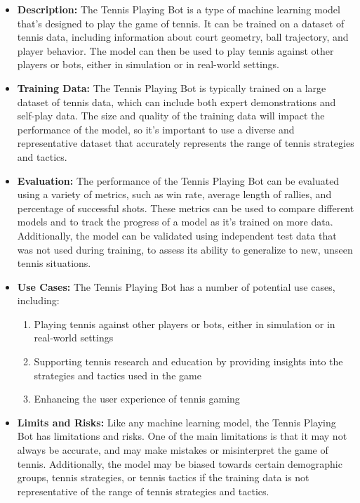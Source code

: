 \begin{itemize}
\begin{itemize}
    \item \textbf{Description:} The Tennis Playing Bot is a type of machine learning model that's designed to play the game of tennis. It can be trained on a dataset of tennis data, including information about court geometry, ball trajectory, and player behavior. The model can then be used to play tennis against other players or bots, either in simulation or in real-world settings.
    \item \textbf{Training Data:} The Tennis Playing Bot is typically trained on a large dataset of tennis data, which can include both expert demonstrations and self-play data. The size and quality of the training data will impact the performance of the model, so it's important to use a diverse and representative dataset that accurately represents the range of tennis strategies and tactics.
    \item \textbf{Evaluation:} The performance of the Tennis Playing Bot can be evaluated using a variety of metrics, such as win rate, average length of rallies, and percentage of successful shots. These metrics can be used to compare different models and to track the progress of a model as it's trained on more data. Additionally, the model can be validated using independent test data that was not used during training, to assess its ability to generalize to new, unseen tennis situations.
    \item \textbf{Use Cases:} The Tennis Playing Bot has a number of potential use cases, including:
        \begin{enumerate}  
            \item Playing tennis against other players or bots, either in simulation or in real-world settings
            \item Supporting tennis research and education by providing insights into the strategies and tactics used in the game
            \item Enhancing the user experience of tennis gaming
        \end{enumerate}
    \item \textbf{Limits and Risks:} Like any machine learning model, the Tennis Playing Bot has limitations and risks. One of the main limitations is that it may not always be accurate, and may make mistakes or misinterpret the game of tennis. Additionally, the model may be biased towards certain demographic groups, tennis strategies, or tennis tactics if the training data is not representative of the range of tennis strategies and tactics.

\end{itemize}
\end{itemize}
